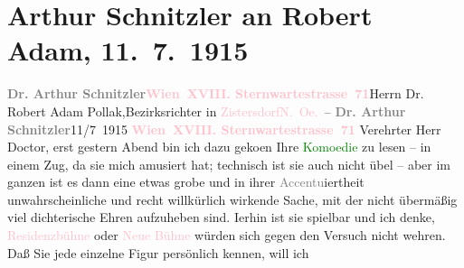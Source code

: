 

               \section[Arthur Schnitzler an Robert Adam, 11. 7. 1915]{ Arthur Schnitzler an Robert Adam, 11. 7. 1915}\nopagebreak{}\rehead{ }\normalsize\beginnumbering{} \toendnotes[C]{\smallbreak\pagebreak[2]} 
\toendnotes[C]{\smallbreak}\pstart{}{\pb}\textcolor{gray}{\textbf{Dr. Arthur Schnitzler}}\pend{}\pstart{}\textcolor{gray}{\textbf{\textcolor{pink}{Wien XVIII. Sternwartestrasse 71}{}\ledrightnote{\textcolor{pink}{Sternwartestraße}}}}\pend{}{\bigskip}\pstart{}{\pb}Herrn Dr. Robert Adam
                        Pollak,\pend{}\pstart{}Bezirksrichter in \textcolor{pink}{Zistersdorf}{}\ledrightnote{\textcolor{pink}{Zistersdorf}}\pend{}\pstart{}\textcolor{pink}{N. Oe.}{}\ledrightnote{\textcolor{pink}{Niederösterreich}} –
                    \pend{}{\bigskip}\pstart
           \noindent{}{\pb}\textcolor{gray}{\textbf{Dr. Arthur Schnitzler}}\hfill 11/7 1915\pend
           \pstart
           \textcolor{gray}{\textbf{\textcolor{pink}{Wien XVIII. Sternwartestrasse 71}{}\ledrightnote{\textcolor{pink}{Sternwartestraße}}}}\pend
           \pstart
           Verehrter Herr Doctor, erst gestern Abend bin ich dazu geko{\geminationm}en Ihre \textcolor{green}{Komoedie}{} zu lesen – in einem Zug, da sie mich
                    amusiert hat; technisch ist sie auch nicht übel – aber im ganzen ist es dann
                    eine etwas grobe und in ihrer \textcolor{gray}{Accentu}iertheit
                    unwahrscheinliche und recht willkürlich wirkende Sache, mit der nicht übermäßig
                        \introOben{}viel\introOben{} dichterische Ehren aufzuheben sind. I{\geminationm}erhin ist sie spielbar und ich denke, \textcolor{pink}{Residenzbühne}{}\ledrightnote{\textcolor{pink}{Kammerspiele Wien}} oder \textcolor{pink}{Neue Bühne}{}\ledrightnote{\textcolor{pink}{Neue Wiener Bühne}} würden sich gegen den Versuch nicht wehren. Daß
                    Sie jede einzelne Figur persönlich kennen, {\pb}will ich

